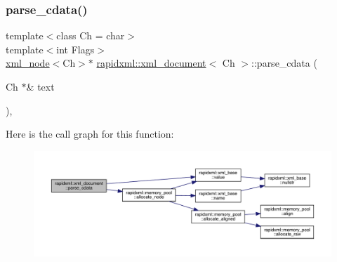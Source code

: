 \mbox{\label{classrapidxml_1_1xml__document_ab94daeb25e8a1609e31210a45b2afa6c}} 
\subsubsection{\texorpdfstring{parse\_cdata()}{parse\_cdata()}}
{\footnotesize\ttfamily template$<$class Ch = char$>$ \\
template$<$int Flags$>$ \\
\mbox{\hyperlink{classrapidxml_1_1xml__node}{xml\+\_\+node}}$<$Ch$>$$\ast$ \mbox{\hyperlink{classrapidxml_1_1xml__document}{rapidxml\+::xml\+\_\+document}}$<$ Ch $>$\+::parse\+\_\+cdata (\begin{DoxyParamCaption}\item[{Ch $\ast$\&}]{text }\end{DoxyParamCaption})\hspace{0.3cm}{\ttfamily [inline]}, {\ttfamily [private]}}

Here is the call graph for this function\+:\nopagebreak
\begin{figure}[H]
\begin{center}
\leavevmode
\includegraphics[width=350pt]{classrapidxml_1_1xml__document_ab94daeb25e8a1609e31210a45b2afa6c_cgraph}
\end{center}
\end{figure}
\mbox{\label{classrapidxml_1_1xml__document_abc287ce83bcb2dc8519e300236004591}} 
